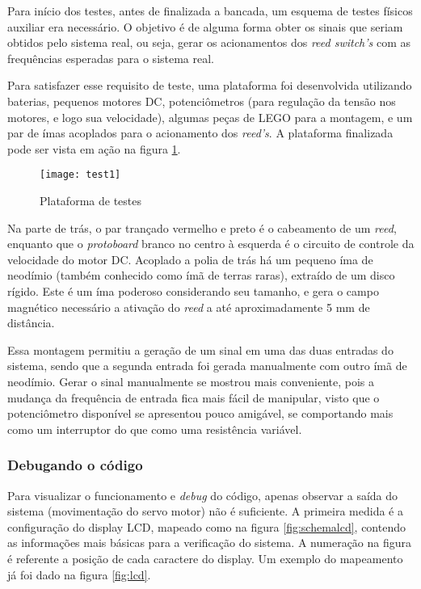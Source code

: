 \documentclass[a4paper,11pt]{article}
\begin{document}
Para início dos testes, antes de finalizada a bancada, um esquema de testes
físicos auxiliar era necessário. O objetivo é de alguma forma obter os sinais
que seriam obtidos pelo sistema real, ou seja, gerar os acionamentos dos
\textit{reed switch's} com as frequências esperadas para o sistema real.

Para satisfazer esse requisito de teste, uma plataforma foi desenvolvida
utilizando baterias, pequenos motores DC, potenciômetros (para regulação da
tensão nos motores, e logo sua velocidade), algumas peças de
LEGO\textsuperscript{\textregistered} para a montagem, e um par de ímas
acoplados para o acionamento dos \textit{reed's}. A plataforma finalizada pode
ser vista em ação na figura \ref{fig:test1}.

\begin{figure}[h!]
\begin{center}
 \texttt{[image: test1]}
\end{center}
  \caption{Plataforma de testes}
  \label{fig:test1}
\end{figure}

Na parte de trás, o par trançado vermelho e preto é o cabeamento de um
\textit{reed}, enquanto que o \textit{protoboard} branco no centro à esquerda é
o circuito de controle da velocidade do motor DC. Acoplado a polia de trás há
um pequeno íma de neodímio (também conhecido como ímã de terras raras),
extraído de um disco rígido. Este é um íma poderoso considerando seu tamanho, e
gera o campo magnético necessário a ativação do \textit{reed} a até
aproximadamente 5 mm de distância.

Essa montagem permitiu a geração de um sinal em uma das duas entradas do
sistema, sendo que a segunda entrada foi gerada manualmente com outro ímã de
neodímio. Gerar o sinal manualmente se mostrou mais conveniente, pois a mudança
da frequência de entrada fica mais fácil de manipular, visto que o
potenciômetro disponível se apresentou pouco amigável, se comportando mais como
um interruptor do que como uma resistência variável.

\subsubsection{Debugando o código}

Para visualizar o funcionamento e \textit{debug} do código, apenas observar a
saída do sistema (movimentação do servo motor) não é suficiente. A primeira
medida é a configuração do display LCD, mapeado como na figura
\ref{fig:schemalcd}, contendo as informações mais básicas para a verificação do
sistema. A numeração na figura é referente a posição de cada caractere do
display. Um exemplo do mapeamento já foi dado na figura \ref{fig:lcd}.
\end{document}
